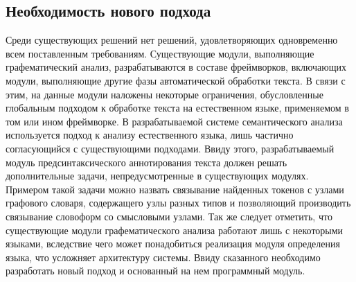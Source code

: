 \subsection{Необходимость нового подхода}
Среди существующих решений нет решений, удовлетворяющих одновременно всем поставленным требованиям.
Существующие модули, выполняющие графематический анализ, разрабатываются в составе фреймворков, включающих модули, выполняющие другие фазы автоматической обработки текста. В связи с этим, на данные модули наложены некоторые ограничения, обусловленные глобальным подходом к обработке текста на естественном языке, применяемом в том или ином фреймворке. В разрабатываемой системе семантического анализа используется подход к анализу естественного языка, лишь частично согласующийся с существующими подходами. Ввиду этого, разрабатываемый модуль предсинтаксического аннотирования текста должен решать дополнительные задачи, непредусмотренные в существующих модулях. Примером такой задачи можно назвать связывание найденных токенов с узлами графового словаря, содержащего узлы разных типов и позволяющий производить связывание словоформ со смысловыми узлами. Так же следует отметить, что существующие модули графематического анализа работают лишь с некоторыми языками, вследствие чего может понадобиться реализация модуля определения языка, что усложняет архитектуру системы. Ввиду сказанного необходимо разработать новый подход и основанный на нем программный модуль.